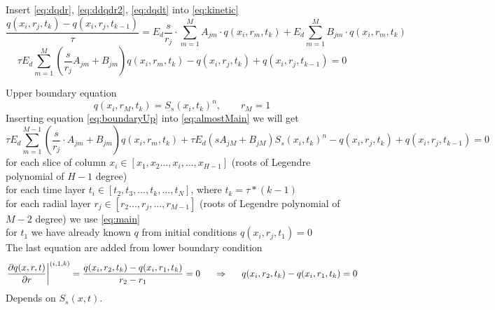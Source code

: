 \documentclass[12pt]{article}
\begin{document}
Insert  \eqref{eq:dqdr}, \eqref{eq:ddqdr2}, \eqref{eq:dqdt} into \eqref{eq:kinetic} 
\begin{equation}
\dfrac{q(x_i,r_j,t_{k}) - q(x_i,r_j,t_{k-1})}{\tau}=
E_d\dfrac{s}{r_j}\cdot \sum_{m=1}^MA_{jm} \cdot q(x_i,r_m,t_{k}) + E_d\sum_{m=1}^MB_{jm}\cdot  q(x_i,r_m,t_{k})
\end{equation}
\begin{equation} \label{eq:almostMain}
\tau E_d\sum_{m=1}^M \left(\dfrac{s}{r_j} A_{jm} + B_{jm} \right) q(x_i,r_m,t_{k}) - q(x_i,r_j,t_{k}) + q(x_i,r_j,t_{k-1}) = 0
\end{equation}

Upper boundary equation
\begin{equation} \label{eq:boundaryUp}
	q(x_i,r_M,t_k) = S_s(x_i, t_k)^n, \qquad r_M=1
\end{equation}
Inserting equation \eqref{eq:boundaryUp} into \eqref{eq:almostMain} we will get
\begin{equation} \label{eq:main}
\tau E_d\sum_{m=1}^{M-1} \left(\dfrac{s}{r_j} \cdot A_{jm} + B_{jm} \right) q(x_i,r_m,t_{k})  +\tau E_d\left(sA_{jM} + B_{jM} \right)S_s(x_i, t_k)^n - q(x_i,r_j,t_{k}) + q(x_i,r_j,t_{k-1})  = 0
\end{equation}
for each slice of column $x_i \in [x_1, x_2 ..., x_i, ..., x_{H-1}]$ (roots of Legendre polynomial of $H-1$ degree) \\
for each time layer $t_i \in [t_2, t_3, ..., t_k, ..., t_N]$, where $t_k=\tau*(k-1)$ \\
for each radial layer  $r_j \in [r_2 ..., r_j, ..., r_{M-1}]$ (roots of Legendre polynomial of $M-2$ degree) we use \eqref{eq:main}\\
for $t_1$ we have already known $q$ from initial conditions $q(x_i,r_j,t_1) = 0$\\
The last equation are added from lower boundary condition
\begin{equation}\label{eq:lowerBoundary}
	\left.\dfrac{\partial q(x,r,t)}{\partial r}\right\vert^{(i, 1, k)}=
	\dfrac{q(x_i,r_2,t_{k}) - q(x_i,r_1,t_{k})}{r_2-r_1}=0 \indent\Rightarrow\indent q(x_i,r_2,t_k) - q(x_i,r_1,t_k)=0
\end{equation}
Depends on $S_s(x, t)$.
\end{document}
